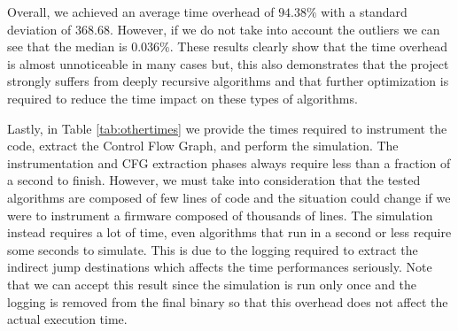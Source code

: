 Overall, we achieved an average time overhead of $94.38\%$ with a standard
deviation of $368.68$. However, if we do not take into account the outliers we
can see that the median is $0.036\%$. These results clearly show that the time overhead
is almost unnoticeable in many cases but, this also demonstrates that the
project strongly suffers from deeply recursive algorithms and that further
optimization is required to reduce the time impact on these types of algorithms.

Lastly, in Table \ref{tab:othertimes} we provide the times required to instrument
the code, extract the Control Flow Graph, and perform the simulation. The
instrumentation and CFG extraction phases always require less than a fraction of
a second to finish. However, we must take into consideration that the tested
algorithms are composed of few lines of code and the situation could change if
we were to instrument a firmware composed of thousands of lines. The simulation instead
requires a lot of time, even algorithms that run in a second or less require
some seconds to simulate. This is due to the logging required to extract the indirect
jump destinations which affects the time performances seriously. Note that we
can accept this result since the simulation is run only once and the logging is
removed from the final binary so that this overhead does not affect the actual
execution time.

